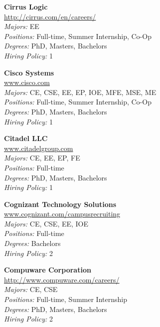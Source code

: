 \documentclass[twoside]{article}
\begin{document}
\begin{center}
\begin{multicols}{3}
\begin{minipage}{.9\columnwidth}{\Large\bf Cirrus Logic }\\
	\url{http://cirrus.com/en/careers/}\\
	\emph{Majors:} EE\\
	\emph{Positions:} Full-time, Summer Internship, Co-Op\\
	\emph{Degrees:} PhD, Masters, Bachelors\\
	\emph{Hiring Policy:} 1\\
\end{minipage}
 
\begin{minipage}{.9\columnwidth}{\Large\bf Cisco Systems }\\
	\url{www.cisco.com}\\
	\emph{Majors:} CE, CSE, EE, EP, IOE, MFE, MSE, ME\\
	\emph{Positions:} Full-time, Summer Internship, Co-Op\\
	\emph{Degrees:} PhD, Masters, Bachelors\\
	\emph{Hiring Policy:} 1\\
\end{minipage}
 
\begin{minipage}{.9\columnwidth}{\Large\bf Citadel LLC }\\
	\url{www.citadelgroup.com}\\
	\emph{Majors:} CE, EE, EP, FE\\
	\emph{Positions:} Full-time\\
	\emph{Degrees:} PhD, Masters, Bachelors\\
	\emph{Hiring Policy:} 1\\
\end{minipage}
 
\begin{minipage}{.9\columnwidth}{\Large\bf Cognizant Technology Solutions }\\
	\url{www.cognizant.com/campusrecruiting}\\
	\emph{Majors:} CE, CSE, EE, IOE\\
	\emph{Positions:} Full-time\\
	\emph{Degrees:} Bachelors\\
	\emph{Hiring Policy:} 2\\
\end{minipage}
 
\begin{minipage}{.9\columnwidth}{\Large\bf Compuware Corporation }\\
	\url{http://www.compuware.com/careers/}\\
	\emph{Majors:} CE, CSE\\
	\emph{Positions:} Full-time, Summer Internship\\
	\emph{Degrees:} PhD, Masters, Bachelors\\
	\emph{Hiring Policy:} 2\\
\end{minipage}
 

\end{multicols}
\end{center}
\end{document}
